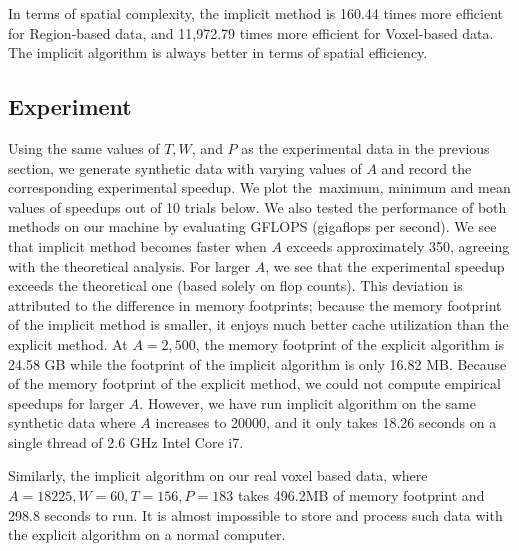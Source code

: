 \documentclass{article}[12pt]
\begin{document}
In terms of spatial complexity, the implicit method is 160.44 times more efficient for Region-based data, and 11,972.79 times more efficient for Voxel-based data. The implicit algorithm is always better in terms of spatial efficiency.

\subsection{Experiment}

Using the same values of  $T, W$, and $P$ as the experimental data in the previous section, we generate synthetic data with varying values of $A$ and record the corresponding experimental speedup. We plot the maximum, minimum and mean values of speedups out of 10 trials below. We also tested the performance of both methods on our machine by evaluating GFLOPS (gigaflops per second).
We see that implicit method becomes faster when $A$ exceeds approximately 350, agreeing with the theoretical analysis.
For larger $A$, we see that the experimental speedup exceeds the theoretical one (based solely on flop counts).
This deviation is attributed to the difference in memory footprints; because the memory footprint of the implicit method is smaller, it enjoys much better cache utilization than the explicit method.
At $A=2{,}500$, the memory footprint of the explicit algorithm is 24.58 GB while the footprint of the implicit algorithm is only 16.82 MB.
Because of the memory footprint of the explicit method, we could not compute empirical speedups for larger $A$. However, we have run implicit algorithm on the same synthetic data where $A$ increases to 20000, and it only takes 18.26 seconds on a single thread of 2.6 GHz Intel Core i7.


Similarly, the implicit algorithm on our real voxel based data, where $A=18225, W = 60, T = 156, P = 183$ takes 496.2MB of memory footprint and 298.8 seconds to run. It is almost impossible to store and process such data with the explicit algorithm on a normal computer.
\end{document}
